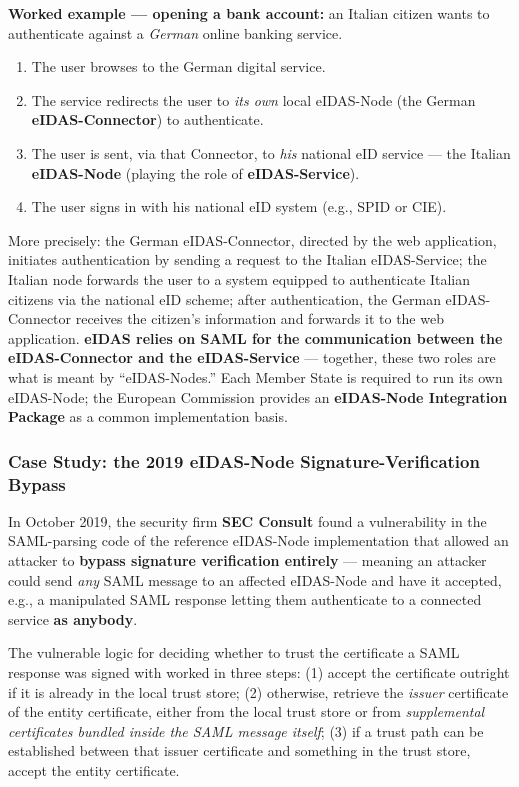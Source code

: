 \documentclass[12pt, a4paper]{article}
\begin{document}
\textbf{Worked example --- opening a bank account:} an Italian citizen wants to authenticate against a \emph{German} online banking service.
\begin{enumerate}
    \item The user browses to the German digital service.
    \item The service redirects the user to \emph{its own} local eIDAS-Node (the German \textbf{eIDAS-Connector}) to authenticate.
    \item The user is sent, via that Connector, to \emph{his} national eID service --- the Italian \textbf{eIDAS-Node} (playing the role of \textbf{eIDAS-Service}).
    \item The user signs in with his national eID system (e.g., SPID or CIE).
\end{enumerate}
More precisely: the German eIDAS-Connector, directed by the web application, initiates authentication by sending a request to the Italian eIDAS-Service; the Italian node forwards the user to a system equipped to authenticate Italian citizens via the national eID scheme; after authentication, the German eIDAS-Connector receives the citizen's information and forwards it to the web application. \textcolor{red!70!black}{\textbf{eIDAS relies on SAML for the communication between the eIDAS-Connector and the eIDAS-Service}} --- together, these two roles are what is meant by ``eIDAS-Nodes.'' Each Member State is required to run its own eIDAS-Node; the European Commission provides an \textbf{eIDAS-Node Integration Package} as a common implementation basis.

\subsubsection{Case Study: the 2019 eIDAS-Node Signature-Verification Bypass}
In October 2019, the security firm \textbf{SEC Consult} found a vulnerability in the SAML-parsing code of the reference eIDAS-Node implementation that allowed an attacker to \textbf{bypass signature verification entirely} --- meaning an attacker could send \emph{any} SAML message to an affected eIDAS-Node and have it accepted, e.g., a manipulated SAML response letting them authenticate to a connected service \textbf{as anybody}.

The vulnerable logic for deciding whether to trust the certificate a SAML response was signed with worked in three steps: (1) accept the certificate outright if it is already in the local trust store; (2) otherwise, retrieve the \emph{issuer} certificate of the entity certificate, either from the local trust store or from \emph{supplemental certificates bundled inside the SAML message itself}; (3) if a trust path can be established between that issuer certificate and something in the trust store, accept the entity certificate.
\end{document}

